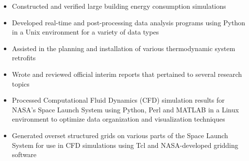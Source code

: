 \documentclass[10pt,ragged2e]{altacv}
\begin{document}
\divider

\begin{itemize}
  \item Constructed and verified large building energy consumption simulations 
\end{itemize}

\begin{itemize}
  \item Developed real-time and post-processing data analysis programs using Python in a Unix environment for a variety of data types
  \item Assisted in the planning and installation of various thermodynamic system retrofits
  \item Wrote and reviewed official interim reports that pertained to several research topics
\end{itemize}

\divider

\begin{itemize}
  \item Processed Computational Fluid Dynamics (CFD) simulation results for NASA's Space Launch System using Python, Perl and MATLAB in a Linux environment to optimize data organization and visualization techniques 
  \item Generated overset structured grids on various parts of the Space Launch System for use in CFD simulations using Tcl and NASA-developed gridding software
\end{itemize}

\clearpage

\nocite{*}
\end{document}
